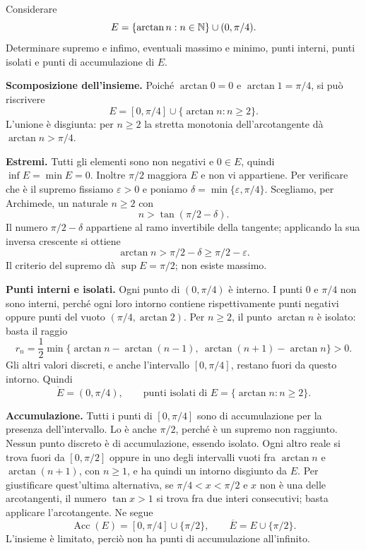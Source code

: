 \begin{esercizio}
Considerare
\[
E=\{\arctan n:n\in\mathbb{N}\}\cup(0,\pi/4).
\]
Determinare supremo e infimo, eventuali massimo e minimo, punti interni, punti isolati e punti di accumulazione di $E$.
\end{esercizio}
\begin{svolgimento}
\textbf{Scomposizione dell'insieme.} Poiché $\arctan0=0$ e $\arctan1=\pi/4$, si può riscrivere
\[
E=[0,\pi/4]\cup\{\arctan n:n\ge2\}.
\]
L'unione è disgiunta: per $n\ge2$ la stretta monotonia dell'arcotangente dà $\arctan n>\pi/4$.

\textbf{Estremi.} Tutti gli elementi sono non negativi e $0\in E$, quindi $\inf E=\min E=0$. Inoltre $\pi/2$ maggiora $E$ e non vi appartiene. Per verificare che è il supremo fissiamo $\varepsilon>0$ e poniamo $\delta=\min\{\varepsilon,\pi/4\}$. Scegliamo, per Archimede, un naturale $n\ge2$ con
\[
n>\tan(\pi/2-\delta).
\]
Il numero $\pi/2-\delta$ appartiene al ramo invertibile della tangente; applicando la sua inversa crescente si ottiene
\[
\arctan n>\pi/2-\delta\ge\pi/2-\varepsilon.
\]
Il criterio del supremo dà $\sup E=\pi/2$; non esiste massimo.

\textbf{Punti interni e isolati.} Ogni punto di $(0,\pi/4)$ è interno. I punti $0$ e $\pi/4$ non sono interni, perché ogni loro intorno contiene rispettivamente punti negativi oppure punti del vuoto $(\pi/4,\arctan2)$. Per $n\ge2$, il punto $\arctan n$ è isolato: basta il raggio
\[
r_n=\frac12\min\{\arctan n-\arctan(n-1),\ \arctan(n+1)-\arctan n\}>0.
\]
Gli altri valori discreti, e anche l'intervallo $[0,\pi/4]$, restano fuori da questo intorno. Quindi
\[
\mathring E=(0,\pi/4),\qquad
\text{punti isolati di }E=\{\arctan n:n\ge2\}.
\]

\textbf{Accumulazione.} Tutti i punti di $[0,\pi/4]$ sono di accumulazione per la presenza dell'intervallo. Lo è anche $\pi/2$, perché è un supremo non raggiunto. Nessun punto discreto è di accumulazione, essendo isolato. Ogni altro reale si trova fuori da $[0,\pi/2]$ oppure in uno degli intervalli vuoti fra $\arctan n$ e $\arctan(n+1)$, con $n\ge1$, e ha quindi un intorno disgiunto da $E$. Per giustificare quest'ultima alternativa, se $\pi/4<x<\pi/2$ e $x$ non è una delle arcotangenti, il numero $\tan x>1$ si trova fra due interi consecutivi; basta applicare l'arcotangente. Ne segue
\[
\operatorname{Acc}(E)=[0,\pi/4]\cup\{\pi/2\},\qquad
\overline E=E\cup\{\pi/2\}.
\]
L'insieme è limitato, perciò non ha punti di accumulazione all'infinito.
\end{svolgimento}

